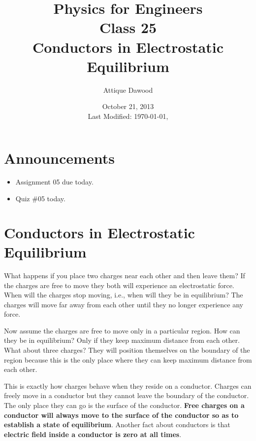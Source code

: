 \documentclass[12pt,a4paper]{article}
\title{\vspace{-3cm}Physics for Engineers\\Class 25\\Conductors in Electrostatic Equilibrium}
\author{Attique Dawood}
\date{October 21, 2013\\[0.2cm] Last Modified: \today, \currenttime}
\begin{document}
\maketitle
\section{Announcements}
\begin{itemize}
\item Assignment 05 due today.
\item Quiz \#05 today.
\end{itemize}
\section{Conductors in Electrostatic Equilibrium}
What happens if you place two charges near each other and then leave them? If the charges are free to move they both will experience an electrostatic force. When will the charges stop moving, i.e., when will they be in equilibrium? The charges will move far away from each other until they no longer experience any force.

Now assume the charges are free to move only in a particular region. How can they be in equilibrium? Only if they keep maximum distance from each other. What about three charges? They will position themselves on the boundary of the region because this is the only place where they can keep maximum distance from each other.

This is exactly how charges behave when they reside on a conductor. Charges can freely move in a conductor but they cannot leave the boundary of the conductor. The only place they can go is the surface of the conductor. \textbf{Free charges on a conductor will always move to the surface of the conductor so as to establish a state of equilibrium}. Another fact about conductors is that \textbf{electric field inside a conductor is zero at all times}.
\end{document}
